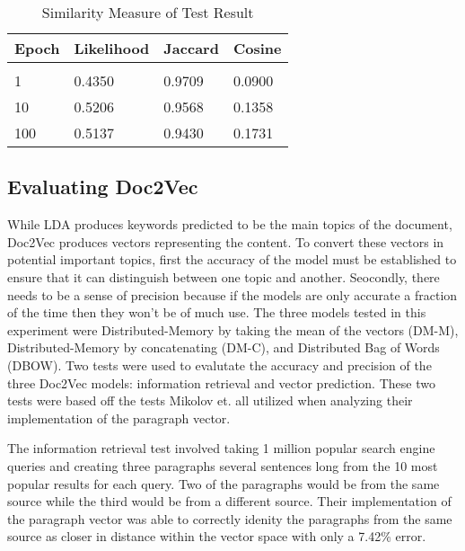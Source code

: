 \begin{table}[!htbp]
\caption{Similarity Measure of Test Result}
\label{lda-jc}
\begin{center}
\begin{tabular}{  l  l l l}
\bf Epoch & \bf Likelihood & \bf Jaccard & \bf Cosine \\ \hline \\
1         &0.4350 & 0.9709 & 0.0900\\
10       &0.5206 & 0.9568 & 0.1358\\
100     &0.5137 &  0.9430 & 0.1731\\
\end{tabular}
\end{center}
\end{table}

\subsection{Evaluating Doc2Vec}
While LDA produces keywords predicted to be the main topics of the document, Doc2Vec produces vectors representing the content. To convert these vectors in potential important topics, first the accuracy of the model must be established to ensure that it can distinguish between one topic and another. Seocondly, there needs to be a sense of precision because if the models are only accurate a fraction of the time then they won't be of much use. The three models tested in this experiment were  Distributed-Memory by taking the mean of the vectors (DM-M), Distributed-Memory by concatenating (DM-C), and Distributed Bag of Words (DBOW). Two tests were used to evalutate the accuracy and precision of the three Doc2Vec models: information retrieval and vector prediction. These two tests were based off the tests Mikolov et. all utilized when analyzing their implementation of the paragraph vector. \cite{RefWorks:doc:5a6e5746e4b0d609eec798d7}

The information retrieval test involved taking 1 million popular search engine queries and creating three paragraphs several sentences long from the 10 most popular results for each query. Two of the paragraphs would be from the same source while the third would be from a different source. Their implementation of the paragraph vector was able to correctly idenity the paragraphs from the same source as closer in distance within the vector space with only a 7.42\% error. 

